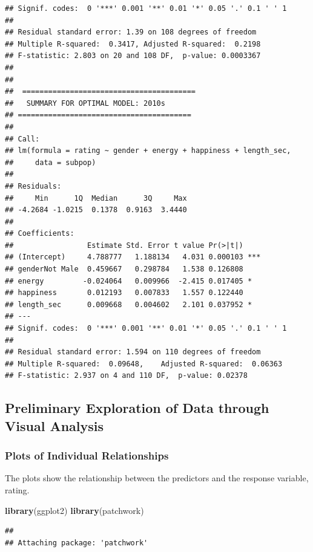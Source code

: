 \documentclass[
]{article}
\newenvironment{Shaded}{\begin{snugshade}}{\end{snugshade}}
\newcommand{\FunctionTok}[1]{\textcolor[rgb]{0.13,0.29,0.53}{\textbf{#1}}}
\newcommand{\NormalTok}[1]{#1}
\begin{document}
\begin{verbatim}
## Signif. codes:  0 '***' 0.001 '**' 0.01 '*' 0.05 '.' 0.1 ' ' 1
## 
## Residual standard error: 1.39 on 108 degrees of freedom
## Multiple R-squared:  0.3417, Adjusted R-squared:  0.2198 
## F-statistic: 2.803 on 20 and 108 DF,  p-value: 0.0003367
## 
## 
##  ======================================== 
##   SUMMARY FOR OPTIMAL MODEL: 2010s 
## ======================================== 
## 
## Call:
## lm(formula = rating ~ gender + energy + happiness + length_sec, 
##     data = subpop)
## 
## Residuals:
##     Min      1Q  Median      3Q     Max 
## -4.2684 -1.0215  0.1378  0.9163  3.4440 
## 
## Coefficients:
##                 Estimate Std. Error t value Pr(>|t|)    
## (Intercept)     4.788777   1.188134   4.031 0.000103 ***
## genderNot Male  0.459667   0.298784   1.538 0.126808    
## energy         -0.024064   0.009966  -2.415 0.017405 *  
## happiness       0.012193   0.007833   1.557 0.122440    
## length_sec      0.009668   0.004602   2.101 0.037952 *  
## ---
## Signif. codes:  0 '***' 0.001 '**' 0.01 '*' 0.05 '.' 0.1 ' ' 1
## 
## Residual standard error: 1.594 on 110 degrees of freedom
## Multiple R-squared:  0.09648,    Adjusted R-squared:  0.06363 
## F-statistic: 2.937 on 4 and 110 DF,  p-value: 0.02378
\end{verbatim}

\subsection{Preliminary Exploration of Data through Visual
Analysis}\label{preliminary-exploration-of-data-through-visual-analysis}

\subsubsection{Plots of Individual
Relationships}\label{plots-of-individual-relationships}

The plots show the relationship between the predictors and the response
variable, rating.

\begin{Shaded}
\begin{Highlighting}[]
\FunctionTok{library}\NormalTok{(ggplot2)}
\FunctionTok{library}\NormalTok{(patchwork)}
\end{Highlighting}
\end{Shaded}

\begin{verbatim}
## 
## Attaching package: 'patchwork'
\end{verbatim}
\end{document}
